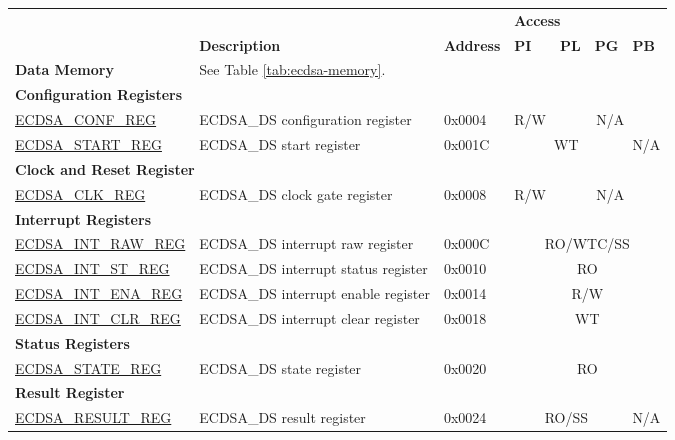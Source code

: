 \begin{longtable}{ | p{4.6cm} | l | p{1.2cm} | l | l | l | l | }
\hline
\rowcolor{lightgray}
 &  &   & \multicolumn{4}{|l|}{\textbf{Access}} \\\cline{4-7}
\rowcolor{lightgray}
\multirow{-2}{*}{\textbf{Name}} & \multirow{-2}{*}{\textbf{Description}}  &  \multirow{-2}{*}{\textbf{Address}} & \textbf{PI} & \textbf{PL} & \textbf{PG} & \textbf{PB} \\ \hline
\endhead
\textbf{Data Memory} & \multicolumn{6}{|l|}{See Table \ref{tab:ecdsa-memory}.} \\ \hline
\multicolumn{7}{|l|}{\textbf{Configuration Registers}} \\\hline
\hyperref[regdesc:ECDSACONFREG]{ECDSA\_CONF\_REG} & ECDSA\_DS configuration register & 0x0004 & R/W & \multicolumn{3}{|c|}{N/A} \\ \hline
\hyperref[regdesc:ECDSASTARTREG]{ECDSA\_START\_REG} & ECDSA\_DS start register & 0x001C & \multicolumn{3}{|c|}{WT} & N/A \\ \hline
\multicolumn{7}{|l|}{\textbf{Clock and Reset Register}} \\ \hline
\hyperref[regdesc:ECDSACLKREG]{ECDSA\_CLK\_REG} & ECDSA\_DS clock gate register & 0x0008 & R/W & \multicolumn{3}{|c|}{N/A} \\ \hline
\multicolumn{7}{|l|}{\textbf{Interrupt Registers}} \\ \hline
\hyperref[regdesc:ECDSAINTRAWREG]{ECDSA\_INT\_RAW\_REG} & ECDSA\_DS interrupt raw register & 0x000C & \multicolumn{4}{|c|}{RO/WTC/SS} \\ \hline
\hyperref[regdesc:ECDSAINTSTREG]{ECDSA\_INT\_ST\_REG} & ECDSA\_DS interrupt status register & 0x0010 & \multicolumn{4}{|c|}{RO} \\ \hline
\hyperref[regdesc:ECDSAINTENAREG]{ECDSA\_INT\_ENA\_REG} & ECDSA\_DS interrupt enable register & 0x0014 & \multicolumn{4}{|c|}{R/W} \\ \hline
\hyperref[regdesc:ECDSAINTCLRREG]{ECDSA\_INT\_CLR\_REG} & ECDSA\_DS interrupt clear register & 0x0018 & \multicolumn{4}{|c|}{WT} \\ \hline
\multicolumn{7}{|l|}{\textbf{Status Registers}} \\ \hline
\hyperref[regdesc:ECDSASTATEREG]{ECDSA\_STATE\_REG} & ECDSA\_DS state register & 0x0020 & \multicolumn{4}{|c|}{RO} \\ \hline
\multicolumn{7}{|l|}{\textbf{Result Register}} \\ \hline
\hyperref[regdesc:ECDSARESULTREG]{ECDSA\_RESULT\_REG} & ECDSA\_DS result register & 0x0024 & \multicolumn{3}{|c|}{RO/SS} & N/A \\ \hline

\end{longtable}
